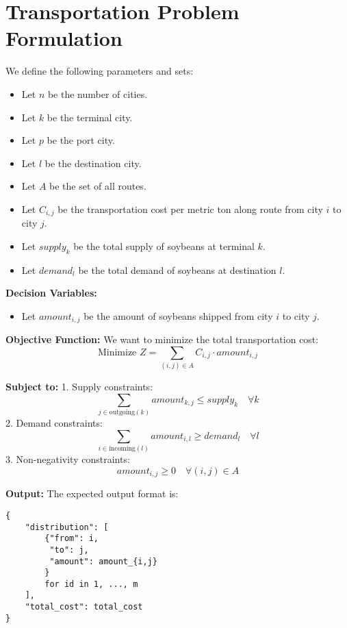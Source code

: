 \documentclass{article}
\begin{document}
\section*{Transportation Problem Formulation}

We define the following parameters and sets:

\begin{itemize}
    \item Let \( n \) be the number of cities.
    \item Let \( k \) be the terminal city.
    \item Let \( p \) be the port city.
    \item Let \( l \) be the destination city.
    \item Let \( A \) be the set of all routes.
    \item Let \( C_{i,j} \) be the transportation cost per metric ton along route from city \( i \) to city \( j \).
    \item Let \( supply_k \) be the total supply of soybeans at terminal \( k \).
    \item Let \( demand_l \) be the total demand of soybeans at destination \( l \).
\end{itemize}

\textbf{Decision Variables:}
\begin{itemize}
    \item Let \( amount_{i,j} \) be the amount of soybeans shipped from city \( i \) to city \( j \).
\end{itemize}

\textbf{Objective Function:}
We want to minimize the total transportation cost:
\[
\text{Minimize } Z = \sum_{(i,j) \in A} C_{i,j} \cdot amount_{i,j}
\]

\textbf{Subject to:}
1. Supply constraints:
\[
\sum_{j \in \text{outgoing}(k)} amount_{k,j} \leq supply_k \quad \forall k
\]
2. Demand constraints:
\[
\sum_{i \in \text{incoming}(l)} amount_{i,l} \geq demand_l \quad \forall l
\]
3. Non-negativity constraints:
\[
amount_{i,j} \geq 0 \quad \forall (i,j) \in A
\]

\textbf{Output:}
The expected output format is:
\begin{verbatim}
{
    "distribution": [
        {"from": i,
         "to": j,
         "amount": amount_{i,j}
        }
        for id in 1, ..., m
    ],
    "total_cost": total_cost
}
\end{verbatim}
\end{document}
